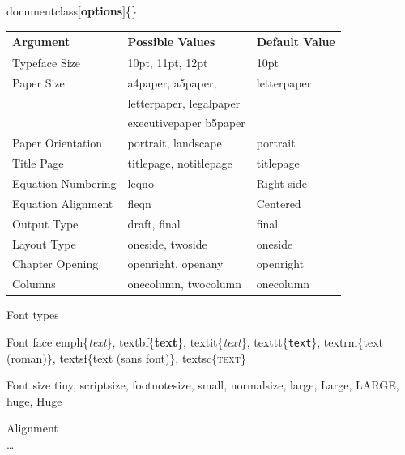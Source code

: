 \documentclass[10pt,times]{beamer}
\begin{document}

\begin{frame}{\bs documentclass$[$\textbf{options}$]$\{\}}
\begin{table}
\renewcommand{\arraystretch}{1.2}
\begin{tabularx}{0.97\textwidth}{lll}
\toprule
\textbf{Argument} & \textbf{Possible Values} & \textbf{Default Value} \\
\midrule
Typeface Size & 10pt, 11pt, 12pt & 10pt   \\
Paper Size & a4paper, a5paper, & letterpaper \\
				& letterpaper, legalpaper &  \\
				& executivepaper b5paper &  \\
Paper Orientation & portrait, landscape & portrait \\
Title Page & titlepage, notitlepage & titlepage \\
Equation Numbering & leqno & Right side \\ 
Equation Alignment & fleqn & Centered \\ 
Output Type				& draft, final & final \\
Layout Type & oneside, twoside & oneside  \\
Chapter Opening & openright, openany & openright \\
Columns & onecolumn, twocolumn & onecolumn \\
\bottomrule
\end{tabularx}
\end{table}
\end{frame}


\begin{frame}{Font types}
\begin{block}{Font face}
\bs emph\{\emph{text}\}, 
\bs textbf\{\textbf{text}\}, 
\bs textit\{\textit{text}\},
\bs texttt\{\texttt{text}\},
\bs textrm\{\textrm{text (roman)}\},
\bs textsf\{\textsf{text (sans font)}\},
\bs textsc\{\textsc{text}\}
\end{block}
\begin{block}{Font size}
\tiny \bs tiny,
\scriptsize \bs scriptsize,
\footnotesize \bs footnotesize,
\small \bs small,
\normalsize \bs normalsize,
\large \bs large,
\Large \bs Large,
\LARGE \bs LARGE,
\huge \bs huge,
\Huge \bs Huge
\end{block}

\begin{block}{Alignment}
\\
\ldots\\
\end{block}
\end{frame}
\end{document}
